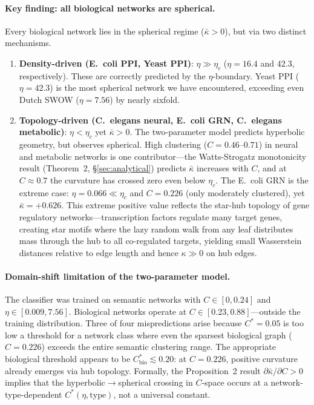 \documentclass[11pt,a4paper]{article}
\newcommand{\kbar}{\bar{\kappa}}
\newcommand{\etac}{\eta_c}
\begin{document}
\paragraph{Key finding: all biological networks are spherical.}
Every biological network lies in the spherical regime ($\kbar > 0$), but via two distinct mechanisms.
\begin{enumerate}
    \item \textbf{Density-driven (E.\ coli PPI, Yeast PPI)}: $\eta \gg \etac$ ($\eta = 16.4$ and $42.3$, respectively). These are correctly predicted by the $\eta$-boundary. Yeast PPI ($\eta = 42.3$) is the most spherical network we have encountered, exceeding even Dutch SWOW ($\eta = 7.56$) by nearly sixfold.

    \item \textbf{Topology-driven (C.\ elegans neural, E.\ coli GRN, C.\ elegans metabolic)}: $\eta < \etac$ yet $\kbar > 0$. The two-parameter model predicts hyperbolic geometry, but observes spherical. High clustering ($C = 0.46$--$0.71$) in neural and metabolic networks is one contributor---the Watts-Strogatz monotonicity result (Theorem~2, §\ref{sec:analytical}) predicts $\kbar$ increases with $C$, and at $C \approx 0.7$ the curvature has crossed zero even below $\etac$. The E.\ coli GRN is the extreme case: $\eta = 0.066 \ll \etac$ and $C = 0.226$ (only moderately clustered), yet $\kbar = +0.626$. This extreme positive value reflects the star-hub topology of gene regulatory networks---transcription factors regulate many target genes, creating star motifs where the lazy random walk from any leaf distributes mass through the hub to all co-regulated targets, yielding small Wasserstein distances relative to edge length and hence $\kappa \gg 0$ on hub edges.
\end{enumerate}

\paragraph{Domain-shift limitation of the two-parameter model.}
The classifier was trained on semantic networks with $C \in [0, 0.24]$ and $\eta \in [0.009, 7.56]$. Biological networks operate at $C \in [0.23, 0.88]$---outside the training distribution. Three of four mispredictions arise because $C^* = 0.05$ is too low a threshold for a network class where even the sparsest biological graph ($C = 0.226$) exceeds the entire semantic clustering range. The appropriate biological threshold appears to be $C^*_{\mathrm{bio}} \lesssim 0.20$: at $C = 0.226$, positive curvature already emerges via hub topology. Formally, the Proposition~2 result $\partial\kbar/\partial C > 0$ implies that the hyperbolic$\to$spherical crossing in $C$-space occurs at a network-type-dependent $C^*(\eta, \mathrm{type})$, not a universal constant.
\end{document}
